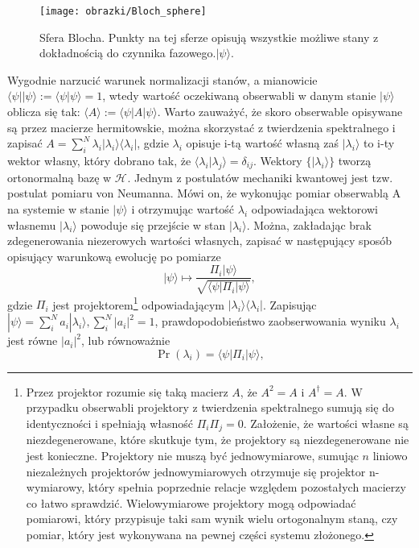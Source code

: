 \documentclass[10pt]{article} %
\newcommand{\Hx}[1]{\mathcal{H}^{#1}}
\newcommand{\Pro}[1]{\Pr(#1)}
\newcommand{\Ket}[1]{|#1\rangle}
\newcommand{\Bra}[1]{\langle#1|}
\newcommand{\Braket}[1]{\langle#1\rangle}
\newcommand{\KP}{\Ket{\psi}}
\newcommand{\BP}{\Bra{\psi}}
\begin{document}
\begin{figure}[t]
\centering
\texttt{[image: obrazki/Bloch\_sphere]}
\caption{Sfera Blocha. Punkty na tej sferze opisują wszystkie możliwe stany z dokładnością do czynnika fazowego.$\KP$.}
\label{fig:bloch}
\end{figure}
Wygodnie narzucić warunek normalizacji stanów, a mianowicie $\Bra{\psi}\Ket{\psi} := \Braket{\psi|\psi} = 1$, wtedy wartość oczekiwaną obserwabli w danym stanie $\Ket{\psi}$ oblicza się tak: $\Braket{A} := \Bra{\psi}A\Ket{\psi}$. Warto zauważyć, że skoro obserwable opisywane są przez macierze hermitowskie, można 
skorzystać z twierdzenia spektralnego i zapisać $A = \sum_i^N \lambda_i \Ket{\lambda_i}\Bra{\lambda_i}$, gdzie $\lambda_i$ opisuje i-tą wartość własną zaś $\Ket{\lambda_i}$ to i-ty wektor własny, który dobrano tak, że $\Braket{\lambda_i|\lambda_j} = \delta_{ij}$. Wektory $\{\Ket{\lambda_i}\}$ tworzą ortonormalną bazę w $\Hx{}$. Jednym z postulatów mechaniki kwantowej jest tzw. postulat pomiaru von Neumanna. Mówi on, że wykonując pomiar obserwablą A na systemie w stanie $\Ket{\psi}$ i otrzymując wartość $\lambda_i$ odpowiadająca wektorowi własnemu $\Ket{\lambda_i}$ powoduje się przejście w stan $\Ket{\lambda_i}$. Można, zakładając brak zdegenerowania niezerowych wartości własnych, zapisać w następujący sposób opisujący warunkową ewolucję po pomiarze 
\begin{equation}
\label{eq:cond_ev}
\Ket{\psi} \mapsto \frac{\Pi_i\Ket{\psi}}{\sqrt{\Bra{\psi}\Pi_i \Ket{\psi}}},
\end{equation}
gdzie $\Pi_i$ jest projektorem\footnote{Przez projektor rozumie się taką macierz $A$, że $A^2 = A$ i $A^\dag = A$. W przypadku obserwabli projektory z twierdzenia spektralnego sumują się do identyczności i spełniają własność $\Pi_i \Pi_j =0$. Założenie, że wartości własne są niezdegenerowane, które skutkuje tym, że projektory są niezdegenerowane nie jest konieczne. Projektory nie muszą być jednowymiarowe, sumując $n$ liniowo niezależnych projektorów jednowymiarowych otrzymuje się projektor n-wymiarowy, który spełnia poprzednie relacje względem pozostałych macierzy co łatwo sprawdzić. Wielowymiarowe projektory mogą odpowiadać pomiarowi, który przypisuje taki sam wynik wielu ortogonalnym staną, czy pomiar, który jest wykonywana na pewnej części systemu złożonego.} odpowiadającym $\Ket{\lambda_i}\Bra{\lambda_i}$. Zapisując $\KP = \sum^N_i a_i \Ket{\lambda_i}, \sum^N_i |a_i|^2=1$, prawdopodobieństwo zaobserwowania wyniku $\lambda_i$ jest równe $|a_i|^2$, lub równoważnie
\begin{equation}
\Pro{\lambda_i} = \BP \Pi_i \KP,
\end{equation}
\end{document}
